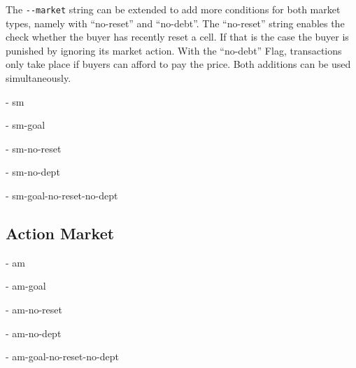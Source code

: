 The \verb|--market| string can be extended to add more conditions for both market types, namely with ``no-reset'' and ``no-debt''. The ``no-reset'' string enables the check whether the buyer has recently reset a cell. If that is the case the buyer is punished by ignoring its market action. With the ``no-debt'' Flag, transactions only take place if buyers can afford to pay the price. Both additions can be used simultaneously.

- sm

- sm-goal

- sm-no-reset

- sm-no-dept

- sm-goal-no-reset-no-dept


\subsection{Action Market}
- am

- am-goal

- am-no-reset

- am-no-dept

- am-goal-no-reset-no-dept
